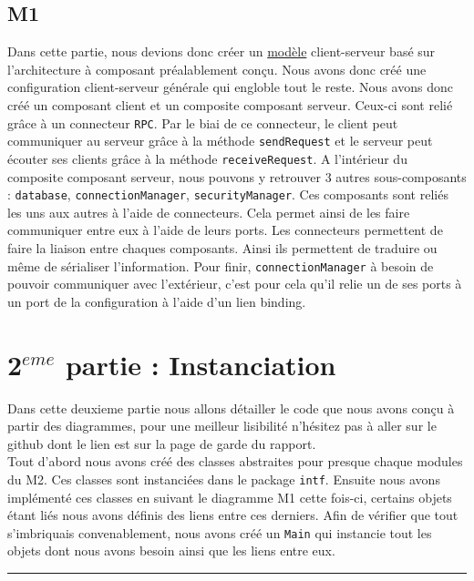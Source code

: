 \documentclass[11pt, a4paper, notitlepage]{article}
\newcommand\tab{\hspace*{10mm}}
\begin{document}
\subsection*{M1}
\tab Dans cette partie, nous devions donc créer un \href{run:../img/Asa_M1.png}{modèle} client-serveur basé sur l'architecture à composant préalablement conçu. Nous avons donc créé une configuration client-serveur générale qui engloble tout le reste. Nous avons donc créé un composant client et un composite composant serveur. Ceux-ci sont relié grâce à un connecteur \verb"RPC". Par le biai de ce connecteur, le client peut communiquer au serveur grâce à la méthode \verb"sendRequest" et le serveur peut écouter ses clients grâce à la méthode \verb"receiveRequest". A l'intérieur du composite composant serveur, nous pouvons y retrouver 3 autres sous-composants : \verb"database", \verb"connectionManager", \verb"securityManager". Ces composants sont reliés les uns aux autres à l'aide de connecteurs. Cela permet ainsi de les faire communiquer entre eux à l'aide de leurs ports. Les connecteurs permettent de faire la liaison entre chaques composants. Ainsi ils permettent de traduire ou même de sérialiser l'information. Pour finir, \verb"connectionManager" à besoin de pouvoir communiquer avec l'extérieur, c'est pour cela qu'il relie un de ses ports à un port de la configuration à l'aide d'un lien binding.

\section*{2$^{eme}$ partie : Instanciation}
\tab Dans cette deuxieme partie nous allons détailler le code que nous avons conçu à partir des diagrammes, pour une meilleur lisibilité n'hésitez pas à aller sur le github dont le lien est sur la page de garde du rapport.\\
\tab Tout d'abord nous avons créé des classes abstraites pour presque chaque modules du M2. Ces classes sont instanciées dans le package \verb"intf". Ensuite nous avons implémenté ces classes en suivant le diagramme M1 cette fois-ci, certains objets étant liés nous avons définis des liens entre ces derniers. Afin de vérifier que tout s'imbriquais convenablement, nous avons créé un \verb"Main" qui instancie tout les objets dont nous avons besoin ainsi que les liens entre eux.

\vspace*{3mm}
\hrule
\vspace*{3mm}
\end{document}
